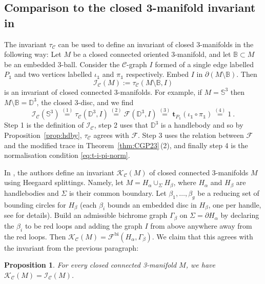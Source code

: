 \documentclass[11pt]{amsart}
\newtheorem{proposition}[thm]{Proposition}
\theoremstyle{definition}
\numberwithin{equation}{section}
\def\bd{{\partial}}
\def\mtr{{\mathbf{t}}} %
\def\cgpt{\mathscr{F}}
\def\cC{\mathcal{C}}
\def\bB{{\mathbb{B}}}
\def\bD{{\mathbb{D}}}
\def\bS{{\mathbb{S}}}
\def\1{{\mathds{1}}}
\begin{document}
\subsection{Comparison to the closed 3-manifold invariant in \texorpdfstring{\cite{CGPT20-Kup}}{}}\label{sec:CGPT-compare}

The invariant $\tau_{\cC}$ can be used to define an invariant of closed 3-manifolds in the following way: Let $M$ be a closed connected oriented 3-manifold, and let $\bB \subset M$ be an embedded 3-ball. 
Consider the $\cC$-graph $I$ formed of a single edge labelled $P_\1$ and two vertices labelled $\iota_\1$ and $\pi_\1$ respectively. Embed $I$ in $\bd (M \setminus \bB)$. Then 
\begin{equation}\label{eq:inv-of-M}
\mathscr{I}_{\cC}(M) := \tau_{\cC}(M\setminus \bB, I) \end{equation}
is an invariant of closed connected 3-manifolds. 
For example, if $M=\bS^3$ then $M\setminus \bB = \bD^3$, the closed 3-disc, and we find
\begin{equation}
  \mathscr{I}_{\cC}(\bS^3) 
  \overset{(1)}=  
  \tau_{\cC}(\bD^3, I) 
  \overset{(2)}= 
  \cgpt(\bD^3, I) 
  \overset{(3)}= 
  \mtr_{P_\1}(\iota_\1 \circ \pi_\1) 
  \overset{(4)}= 1 \ .
\end{equation}
Step 1 is the definition of $\mathscr{I}_{\cC}$, step 2 uses that $\bD^3$ is a handlebody and so by Proposition~\ref{prop:hdby}, $\tau_\cC$ agrees with $\cgpt$. Step 3 uses the relation between $\cgpt$ and the modified trace in Theorem~\ref{thm:CGP23}\,(2), and finally step 4 is the normalisation condition \eqref{eq:t-i-pi-norm}.

In \cite[Thm.\,2.4]{CGPT20-Kup}, the authors define an invariant $\mathcal{K}_{\cC}(M)$ of closed connected 3-manifolds $M$ using Heegaard splittings. Namely, let $M = H_\alpha \cup_\Sigma H_\beta$, where $H_\alpha$ and $H_\beta$ are handlebodies and $\Sigma$ is their common boundary. Let $\beta_1,\dots,\beta_g$ be a reducing set of bounding circles for $H_\beta$ (each $\beta_i$ bounds an embedded disc in $H_\beta$, one per handle, see \cite{CGPT20-Kup} for details). Build an admissible bichrome graph $\Gamma_\beta$ on $\Sigma = \partial H_\alpha$ by declaring the $\beta_i$ to be red loops and adding the graph $I$ from above anywhere away from the red loops. Then $\mathcal{K}_{\cC}(M) = \cgpt^\mathrm{bi}(H_\alpha,\Gamma_\beta)$.
We claim that this agrees with the invariant from the previous paragraph: 

\begin{proposition}\label{prop:compare-closed}
For every closed connected 3-manifold $M$, we have
$\mathcal{K}_{\cC}(M) = \mathscr{I}_{\cC}(M)$. 
\end{proposition}
\end{document}
